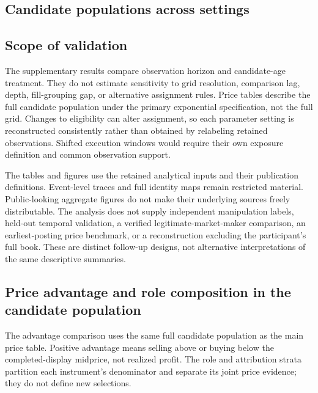 \documentclass[11pt]{article}
\begin{document}
\begingroup
\captionsetup{hypcap=false}
\par\medskip
\noindent\begin{minipage}{\textwidth}
\subsection{Candidate populations across settings}

\end{minipage}\par\medskip

\FloatBarrier
\endgroup

\subsection{Scope of validation}
The supplementary results compare observation horizon and candidate-age treatment. They do not estimate sensitivity to grid resolution, comparison lag, depth, fill-grouping gap, or alternative assignment rules. Price tables describe the full candidate population under the primary exponential specification, not the full grid. Changes to eligibility can alter assignment, so each parameter setting is reconstructed consistently rather than obtained by relabeling retained observations. Shifted execution windows would require their own exposure definition and common observation support.

The tables and figures use the retained analytical inputs and their publication definitions. Event-level traces and full identity maps remain restricted material. Public-looking aggregate figures do not make their underlying sources freely distributable. The analysis does not supply independent manipulation labels, held-out temporal validation, a verified legitimate-market-maker comparison, an earliest-posting price benchmark, or a reconstruction excluding the participant's full book. These are distinct follow-up designs, not alternative interpretations of the same descriptive summaries.


\subsection{Price advantage and role composition in the candidate population}
The advantage comparison uses the same full candidate population as the main price table. Positive advantage means selling above or buying below the completed-display midprice, not realized profit. The role and attribution strata partition each instrument's denominator and separate its joint price evidence; they do not define new selections.

\FloatBarrier
\begingroup
\captionsetup{hypcap=false}

\end{document}
